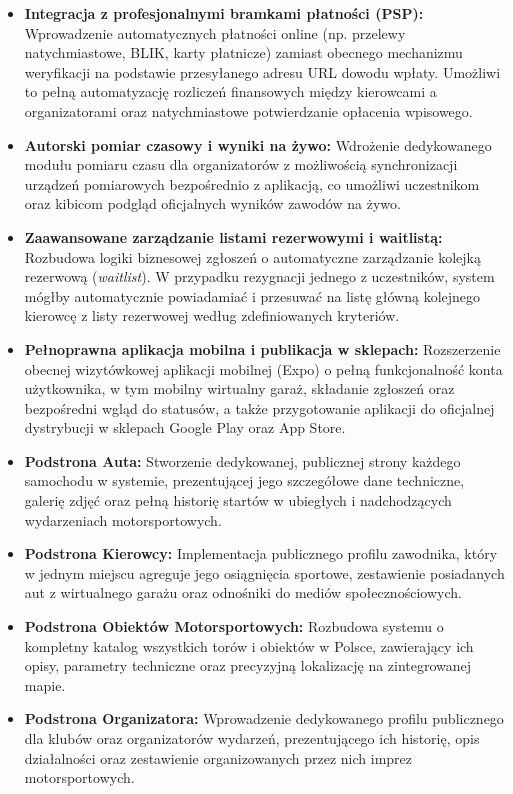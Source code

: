 \documentclass{sprz}
\begin{document}
\begin{itemize}
    \item \textbf{Integracja z profesjonalnymi bramkami płatności (PSP):} 
    Wprowadzenie automatycznych płatności online (np. przelewy natychmiastowe, BLIK, karty płatnicze) zamiast obecnego mechanizmu weryfikacji na podstawie przesyłanego adresu URL dowodu wpłaty. Umożliwi to pełną automatyzację rozliczeń finansowych między kierowcami a organizatorami oraz natychmiastowe potwierdzanie opłacenia wpisowego.

    \item \textbf{Autorski pomiar czasowy i wyniki na żywo:} 
    Wdrożenie dedykowanego modułu pomiaru czasu dla organizatorów z możliwością synchronizacji urządzeń pomiarowych bezpośrednio z aplikacją, co umożliwi uczestnikom oraz kibicom podgląd oficjalnych wyników zawodów na żywo.

    \item \textbf{Zaawansowane zarządzanie listami rezerwowymi i waitlistą:} 
    Rozbudowa logiki biznesowej zgłoszeń o automatyczne zarządzanie kolejką rezerwową (\emph{waitlist}). W przypadku rezygnacji jednego z uczestników, system mógłby automatycznie powiadamiać i przesuwać na listę główną kolejnego kierowcę z listy rezerwowej według zdefiniowanych kryteriów.

    \item \textbf{Pełnoprawna aplikacja mobilna i publikacja w sklepach:} 
    Rozszerzenie obecnej wizytówkowej aplikacji mobilnej (Expo) o pełną funkcjonalność konta użytkownika, w tym mobilny wirtualny garaż, składanie zgłoszeń oraz bezpośredni wgląd do statusów, a także przygotowanie aplikacji do oficjalnej dystrybucji w sklepach Google Play oraz App Store.

    \item \textbf{Podstrona Auta:} 
    Stworzenie dedykowanej, publicznej strony każdego samochodu w systemie, prezentującej jego szczegółowe dane techniczne, galerię zdjęć oraz pełną historię startów w ubiegłych i nadchodzących wydarzeniach motorsportowych.

    \item \textbf{Podstrona Kierowcy:} 
    Implementacja publicznego profilu zawodnika, który w jednym miejscu agreguje jego osiągnięcia sportowe, zestawienie posiadanych aut z wirtualnego garażu oraz odnośniki do mediów społecznościowych.

    \item \textbf{Podstrona Obiektów Motorsportowych:} 
    Rozbudowa systemu o kompletny katalog wszystkich torów i obiektów w Polsce, zawierający ich opisy, parametry techniczne oraz precyzyjną lokalizację na zintegrowanej mapie.

    \item \textbf{Podstrona Organizatora:} 
    Wprowadzenie dedykowanego profilu publicznego dla klubów oraz organizatorów wydarzeń, prezentującego ich historię, opis działalności oraz zestawienie organizowanych przez nich imprez motorsportowych.
\end{itemize}
\end{document}
